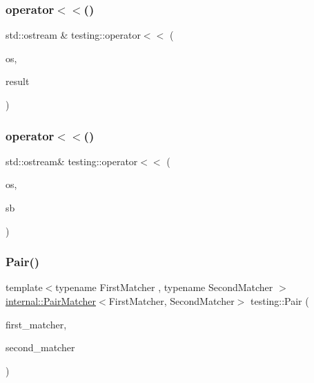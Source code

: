 \mbox{\label{namespacetesting_a7c88897836b9f492190fb2b9dfa3a327}} 
\subsubsection{\texorpdfstring{operator$<$$<$()}{operator<<()}\hspace{0.1cm}{\footnotesize\ttfamily [1/2]}}
{\footnotesize\ttfamily std\+::ostream \& testing\+::operator$<$$<$ (\begin{DoxyParamCaption}\item[{std\+::ostream \&}]{os,  }\item[{const \hyperlink{classtesting_1_1_test_part_result}{Test\+Part\+Result} \&}]{result }\end{DoxyParamCaption})}

\mbox{\label{namespacetesting_a7b802e532fd68749765cb7dc156130db}} 
\subsubsection{\texorpdfstring{operator$<$$<$()}{operator<<()}\hspace{0.1cm}{\footnotesize\ttfamily [2/2]}}
{\footnotesize\ttfamily std\+::ostream\& testing\+::operator$<$$<$ (\begin{DoxyParamCaption}\item[{std\+::ostream \&}]{os,  }\item[{const \hyperlink{classtesting_1_1_message}{Message} \&}]{sb }\end{DoxyParamCaption})\hspace{0.3cm}{\ttfamily [inline]}}

\mbox{\label{namespacetesting_ac7520de8af26d3085513eeeb68561889}} 
\subsubsection{\texorpdfstring{Pair()}{Pair()}}
{\footnotesize\ttfamily template$<$typename First\+Matcher , typename Second\+Matcher $>$ \\
\hyperlink{classtesting_1_1internal_1_1_pair_matcher}{internal\+::\+Pair\+Matcher}$<$First\+Matcher, Second\+Matcher$>$ testing\+::\+Pair (\begin{DoxyParamCaption}\item[{First\+Matcher}]{first\+\_\+matcher,  }\item[{Second\+Matcher}]{second\+\_\+matcher }\end{DoxyParamCaption})\hspace{0.3cm}{\ttfamily [inline]}}


